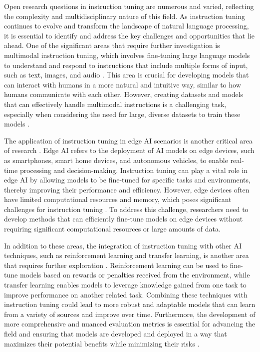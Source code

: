 \documentclass[11pt]{article}
\begin{document}
Open research questions in instruction tuning are numerous and varied, reflecting the complexity and multidisciplinary nature of this field. As instruction tuning continues to evolve and transform the landscape of natural language processing, it is essential to identify and address the key challenges and opportunities that lie ahead. One of the significant areas that require further investigation is multimodal instruction tuning, which involves fine-tuning large language models to understand and respond to instructions that include multiple forms of input, such as text, images, and audio \cite{ref133}. This area is crucial for developing models that can interact with humans in a more natural and intuitive way, similar to how humans communicate with each other. However, creating datasets and models that can effectively handle multimodal instructions is a challenging task, especially when considering the need for large, diverse datasets to train these models \cite{ref140}.

The application of instruction tuning in edge AI scenarios is another critical area of research \cite{ref141}. Edge AI refers to the deployment of AI models on edge devices, such as smartphones, smart home devices, and autonomous vehicles, to enable real-time processing and decision-making. Instruction tuning can play a vital role in edge AI by allowing models to be fine-tuned for specific tasks and environments, thereby improving their performance and efficiency. However, edge devices often have limited computational resources and memory, which poses significant challenges for instruction tuning \cite{ref142}. To address this challenge, researchers need to develop methods that can efficiently fine-tune models on edge devices without requiring significant computational resources or large amounts of data.

In addition to these areas, the integration of instruction tuning with other AI techniques, such as reinforcement learning and transfer learning, is another area that requires further exploration \cite{ref143}. Reinforcement learning can be used to fine-tune models based on rewards or penalties received from the environment, while transfer learning enables models to leverage knowledge gained from one task to improve performance on another related task. Combining these techniques with instruction tuning could lead to more robust and adaptable models that can learn from a variety of sources and improve over time. Furthermore, the development of more comprehensive and nuanced evaluation metrics is essential for advancing the field and ensuring that models are developed and deployed in a way that maximizes their potential benefits while minimizing their risks \cite{ref144}.
\end{document}
